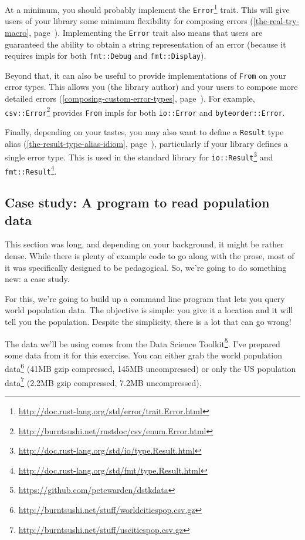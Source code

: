 \documentclass[a4paper,]{book}
\renewcommand*{\hypertarget}[3][\ar]{%
  \def\ar{#2}%
  \label{#1}%
  #3}
\renewcommand*{\hyperlink}[2]{%
 #2 (\autoref{#1}, page~\pageref{#1})}
\renewcommand{\href}[2]{#2\footnote{\url{#1}}}
\begin{document}
At a minimum, you should probably implement the
\href{http://doc.rust-lang.org/std/error/trait.Error.html}{\texttt{Error}}
trait. This will give users of your library some minimum flexibility for
\protect\hyperlink{the-real-try-macro}{composing errors}. Implementing
the \texttt{Error} trait also means that users are guaranteed the
ability to obtain a string representation of an error (because it
requires impls for both \texttt{fmt::Debug} and \texttt{fmt::Display}).

Beyond that, it can also be useful to provide implementations of
\texttt{From} on your error types. This allows you (the library author)
and your users to
\protect\hyperlink{composing-custom-error-types}{compose more detailed
errors}. For example,
\href{http://burntsushi.net/rustdoc/csv/enum.Error.html}{\texttt{csv::Error}}
provides \texttt{From} impls for both \texttt{io::Error} and
\texttt{byteorder::Error}.

Finally, depending on your tastes, you may also want to define a
\protect\hyperlink{the-result-type-alias-idiom}{\texttt{Result} type
alias}, particularly if your library defines a single error type. This
is used in the standard library for
\href{http://doc.rust-lang.org/std/io/type.Result.html}{\texttt{io::Result}}
and
\href{http://doc.rust-lang.org/std/fmt/type.Result.html}{\texttt{fmt::Result}}.

\hypertarget{case-study-a-program-to-read-population-data}{\subsection{Case
study: A program to read population
data}\label{case-study-a-program-to-read-population-data}}

This section was long, and depending on your background, it might be
rather dense. While there is plenty of example code to go along with the
prose, most of it was specifically designed to be pedagogical. So, we're
going to do something new: a case study.

For this, we're going to build up a command line program that lets you
query world population data. The objective is simple: you give it a
location and it will tell you the population. Despite the simplicity,
there is a lot that can go wrong!

The data we'll be using comes from the
\href{https://github.com/petewarden/dstkdata}{Data Science Toolkit}.
I've prepared some data from it for this exercise. You can either grab
the \href{http://burntsushi.net/stuff/worldcitiespop.csv.gz}{world
population data} (41MB gzip compressed, 145MB uncompressed) or only the
\href{http://burntsushi.net/stuff/uscitiespop.csv.gz}{US population
data} (2.2MB gzip compressed, 7.2MB uncompressed).
\end{document}
